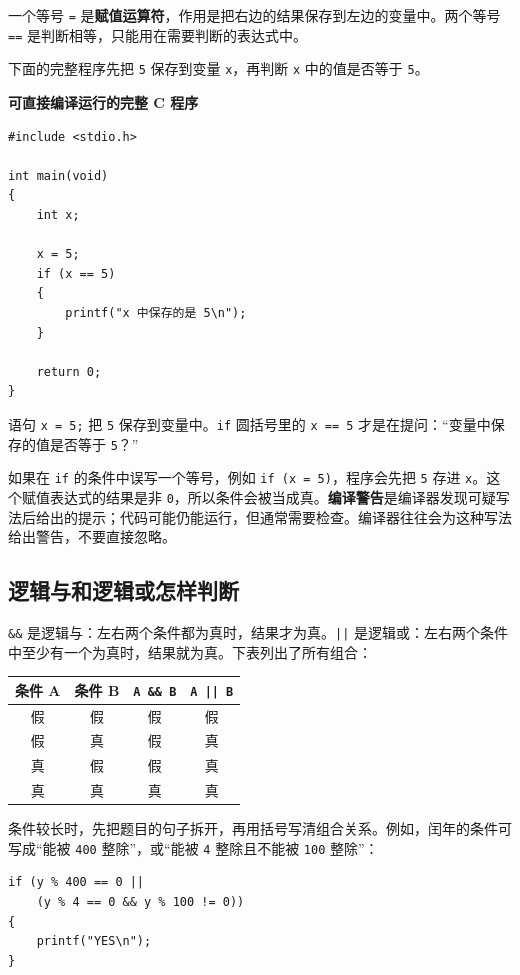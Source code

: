 \documentclass[UTF8,zihao=-4,fontset=windows]{ctexart}
\newcommand{\term}[1]{\textbf{\color{navy}#1}}
\newcommand{\clabel}{\noindent\textbf{可直接编译运行的完整 C 程序}\par\nopagebreak}
\begin{document}
一个等号 \verb|=| 是\term{赋值运算符}，作用是把右边的结果保存到左边的变量中。两个等号 \verb|==| 是判断相等，只能用在需要判断的表达式中。

下面的完整程序先把 \verb|5| 保存到变量 \verb|x|，再判断 \verb|x| 中的值是否等于 \verb|5|。

\clabel
\begin{lstlisting}[style=cstyle]
#include <stdio.h>

int main(void)
{
    int x;

    x = 5;
    if (x == 5)
    {
        printf("x 中保存的是 5\n");
    }

    return 0;
}
\end{lstlisting}

语句 \verb|x = 5;| 把 \verb|5| 保存到变量中。\verb|if| 圆括号里的 \verb|x == 5| 才是在提问：“变量中保存的值是否等于 \verb|5|？”

如果在 \verb|if| 的条件中误写一个等号，例如 \verb|if (x = 5)|，程序会先把 \verb|5| 存进 \verb|x|。这个赋值表达式的结果是非 \verb|0|，所以条件会被当成真。\term{编译警告}是编译器发现可疑写法后给出的提示；代码可能仍能运行，但通常需要检查。编译器往往会为这种写法给出警告，不要直接忽略。

\subsection{逻辑与和逻辑或怎样判断}

\verb|&&| 是逻辑与：左右两个条件都为真时，结果才为真。\verb+||+ 是逻辑或：左右两个条件中至少有一个为真时，结果就为真。下表列出了所有组合：

\begin{center}
\begin{tabular}{cccc}
\toprule
条件 A & 条件 B & \texttt{A \&\& B} & \texttt{A || B} \\
\midrule
假 & 假 & 假 & 假 \\
假 & 真 & 假 & 真 \\
真 & 假 & 假 & 真 \\
真 & 真 & 真 & 真 \\
\bottomrule
\end{tabular}
\end{center}

条件较长时，先把题目的句子拆开，再用括号写清组合关系。例如，闰年的条件可写成“能被 \verb|400| 整除”，或“能被 \verb|4| 整除且不能被 \verb|100| 整除”：

\begin{lstlisting}[style=cstyle]
if (y % 400 == 0 ||
    (y % 4 == 0 && y % 100 != 0))
{
    printf("YES\n");
}
\end{lstlisting}
\end{document}
